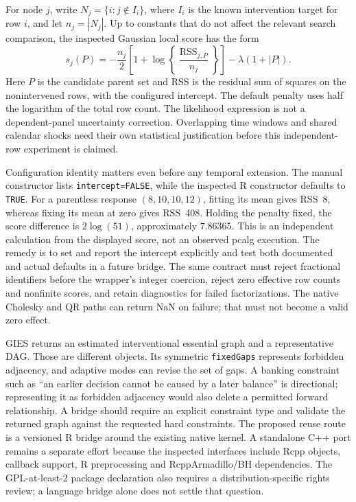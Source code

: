 For node $j$, write $N_j=\{i:j\notin I_i\}$, where $I_i$ is the known
intervention target for row $i$, and let $n_j=|N_j|$. Up to constants that do
not affect the relevant search comparison, the inspected Gaussian local score
has the form
\[
 s_j(P)=-\frac{n_j}{2}\left[1+\log\left\{
       \frac{\operatorname{RSS}_{j,P}}{n_j}\right\}\right]
       -\lambda(1+|P|).
\]
Here $P$ is the candidate parent set and RSS is the residual sum of squares
on the nonintervened rows, with the configured intercept. The default penalty
uses half the logarithm of the total row count. The likelihood expression is
not a dependent-panel uncertainty correction. Overlapping time windows and
shared calendar shocks need their own statistical justification before this
independent-row experiment is claimed.

Configuration identity matters even before any temporal extension. The
manual constructor lists \texttt{intercept=FALSE}, while the inspected R
constructor defaults to \texttt{TRUE}. For a parentless response
$(8,10,10,12)$, fitting its mean gives RSS~8, whereas fixing its mean at zero
gives RSS~408. Holding the penalty fixed, the score difference is
$2\log(51)$, approximately $7.86365$. This is an independent calculation from
the displayed score, not an observed pcalg execution. The remedy is to set and
report the intercept explicitly and test both documented and actual defaults
in a future bridge. The same contract must reject fractional identifiers
before the wrapper's integer coercion, reject zero effective row counts and
nonfinite scores, and retain diagnostics for failed factorizations. The native
Cholesky and QR paths can return NaN on failure; that must not become a valid
zero effect.\citep{exec16_ct_pcalg,exec16_ct_oracle}

GIES returns an estimated interventional essential graph and a representative
DAG. Those are different objects. Its symmetric \texttt{fixedGaps} represents
forbidden adjacency, and adaptive modes can revise the set of gaps. A banking
constraint such as ``an earlier decision cannot be caused by a later balance''
is directional; representing it as forbidden adjacency would also delete a
permitted forward relationship. A bridge should require an explicit constraint
type and validate the returned graph against the requested hard constraints.
The proposed reuse route is a versioned R bridge around the existing native
kernel. A standalone C++ port remains a separate effort because the inspected
interfaces include Rcpp objects, callback support, R preprocessing and
RcppArmadillo/BH dependencies. The GPL-at-least-2 package declaration also
requires a distribution-specific rights review; a language bridge alone does
not settle that question.\citep{exec16_ct_pcalg}

